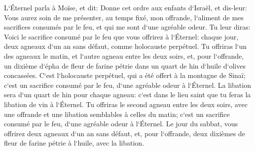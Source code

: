 \verse L`Éternel parla à Moïse, et dit: Donne cet ordre aux enfants d`Israël, et dis-leur: 
\verse Vous aurez soin de me présenter, au temps fixé, mon offrande, l`aliment de mes sacrifices consumés par le feu, et qui me sont d`une agréable odeur. 
\verse Tu leur diras: Voici le sacrifice consumé par le feu que vous offrirez à l`Éternel: chaque jour, deux agneaux d`un an sans défaut, comme holocauste perpétuel. 
\verse Tu offriras l`un des agneaux le matin, et l`autre agneau entre les deux soirs, 
\verse et, pour l`offrande, un dixième d`épha de fleur de farine pétrie dans un quart de hin d`huile d`olives concassées. 
\verse C`est l`holocauste perpétuel, qui a été offert à la montagne de Sinaï; c`est un sacrifice consumé par le feu, d`une agréable odeur à l`Éternel. 
\verse La libation sera d`un quart de hin pour chaque agneau: c`est dans le lieu saint que tu feras la libation de vin à l`Éternel. 
\verse Tu offriras le second agneau entre les deux soirs, avec une offrande et une libation semblables à celles du matin; c`est un sacrifice consumé par le feu, d`une agréable odeur à l`Éternel. 
\verse Le jour du sabbat, vous offrirez deux agneaux d`un an sans défaut, et, pour l`offrande, deux dixièmes de fleur de farine pétrie à l`huile, avec la libation. 
